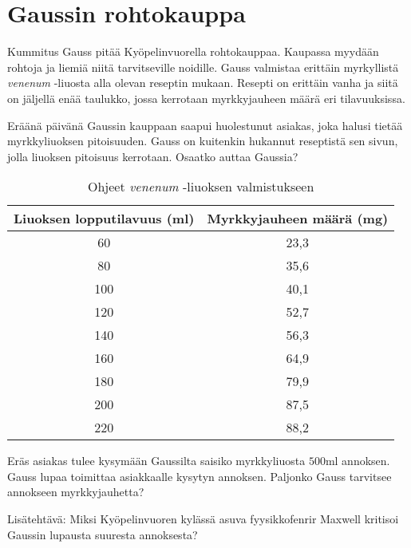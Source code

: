 \clearpage

\section{Gaussin rohtokauppa}

Kummitus Gauss pitää Kyöpelinvuorella rohtokauppaa. Kaupassa myydään rohtoja ja liemiä niitä tarvitseville noidille. Gauss valmistaa erittäin myrkyllistä \textit{venenum} -liuosta alla olevan reseptin mukaan. Resepti on erittäin vanha ja siitä on jäljellä enää taulukko, jossa kerrotaan myrkkyjauheen määrä eri tilavuuksissa. 

Eräänä päivänä Gaussin kauppaan saapui huolestunut asiakas, joka halusi tietää myrkkyliuoksen pitoisuuden. Gauss on kuitenkin hukannut reseptistä sen sivun, jolla liuoksen pitoisuus kerrotaan. Osaatko auttaa Gaussia?

\begin{table}[h]
  \centering
    \begin{tabular}{| c | c |}
    \hline
    Liuoksen lopputilavuus (ml) & Myrkkyjauheen määrä (mg) \\
    \hline
    60 & 23{,}3 \\
    80 & 35{,}6 \\
    100 & 40{,}1 \\
    120 & 52{,}7 \\
    140 & 56{,}3 \\
    160 & 64{,}9 \\
    180 & 79{,}9 \\
    200 & 87{,}5 \\
    220 & 88{,}2 \\
    \hline
    \end{tabular}
  \caption*{Ohjeet \textit{venenum} -liuoksen valmistukseen}
\end{table}

Eräs asiakas tulee kysymään Gaussilta saisiko myrkkyliuosta $500 \text{ml}$ annoksen. Gauss lupaa toimittaa asiakkaalle kysytyn annoksen. Paljonko Gauss tarvitsee annokseen myrkkyjauhetta? 


Lisätehtävä: Miksi Kyöpelinvuoren kylässä asuva fyysikkofenrir Maxwell kritisoi Gaussin lupausta suuresta annoksesta? 